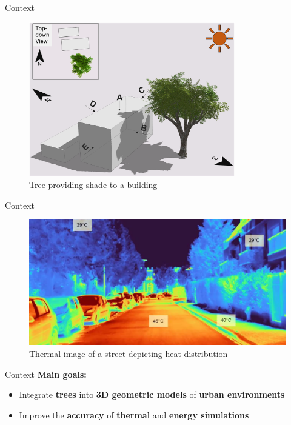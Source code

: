 \documentclass[10pt]{beamer}
\begin{document}
\begin{frame}{Context}
  \begin{figure}
      \centering
      \includegraphics[width=0.8\textwidth]{images/TreeShade.png}
      \caption{Tree providing shade to a building\cite{img:TreeShade}}
  \end{figure}
\end{frame}

\begin{frame}{Context}
  \begin{figure}
      \centering
      \includegraphics[width=\textwidth]{images/heat_street.png}
      \caption{Thermal image of a street depicting heat distribution\cite{img:street_thermography}}
  \end{figure}
\end{frame}

\begin{frame}{Context}
  \Large
  \textbf{Main goals:}
  \begin{itemize}
    \item Integrate \textbf{trees} into \textbf{3D geometric models} of \textbf{urban environments}
    \item Improve the \textbf{accuracy} of \textbf{thermal} and \textbf{energy simulations}
  \end{itemize}
\end{frame}
\end{document}
